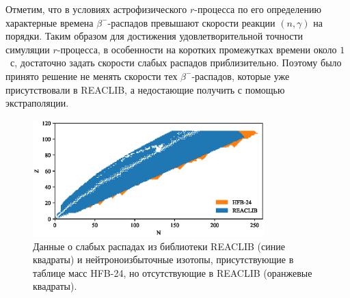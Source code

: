   Отметим, что в условиях астрофизического $r$-процесса по его определению характерные времена $\beta^-$-распадов превышают скорости реакции $(n,\gamma)$ на порядки. Таким образом для достижения удовлетворительной точности симуляции $r$-процесса, в особенности на коротких промежутках времени около $1$~с, достаточно задать скорости слабых распадов приблизительно. Поэтому было принято решение не менять скорости тех $\beta^-$-распадов, которые уже присутствовали в REACLIB, а недостающие получить с помощью экстраполяции.
  
\begin{figure}
  \centering
  \includegraphics[width=0.8\textwidth]{pics/chart_weak_comparison.eps}
  \caption{Данные о слабых распадах из библиотеки REACLIB (синие квадраты) и нейтроноизбыточные изотопы, присутствующие в таблице масс HFB-24, но отсутствующие в REACLIB (оранжевые квадраты).}
  \label{img:weak_comparison}
\end{figure}
 
